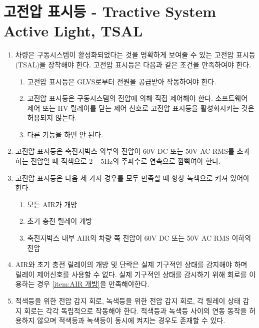 \documentclass[final,a4paper,10pt]{report}
\begin{document}
\section{고전압 표시등 - Tractive System Active Light, TSAL}
\begin{enumerate}
  \item 차량은 구동시스템이 활성화되었다는 것을 명확하게 보여줄 수 있는 고전압 표시등(TSAL)을 장착해야 한다. 고전압 표시등은 다음과 같은 조건을 만족하여야 한다.
    \begin{enumerate}
      \item 고전압 표시등은 GLVS로부터 전원을 공급받아 작동하여야 한다.
      \item 고전압 표시등은 구동시스템의 전압에 의해 직접 제어해야 한다. 소프트웨어 제어 또는 HV 릴레이를 닫는 제어 신호로 고전압 표시등을 활성화시키는 것은 허용되지 않는다.
      \item 다른 기능을 하면 안 된다.
    \end{enumerate}
    
  \item 고전압 표시등은 축전지박스 외부의 전압이 60V DC 또는 50V AC RMS를 초과하는 전압일 때 적색으로 2 \string~ 5Hz의 주파수로 연속으로 깜빡여야 한다.
  
  \item 고전압 표시등은 다음 세 가지 경우를 모두 만족할 때 항상 녹색으로 켜져 있어야 한다. \label{item:고전압 표시등 녹색}
    \begin{enumerate}
      \item 모든 AIR가 개방
      \item 초기 충전 릴레이 개방
      \item 축전지박스 내부 AIR의 차량 쪽 전압이 60V DC 또는 50V AC RMS 이하의 전압
    \end{enumerate}
    
  \item AIR와 초기 충전 릴레이의 개방 및 단락은 실제 기구적인 상태를 감지해야 하며 릴레이 제어신호를 사용할 수 없다. 실제 기구적인 상태를 감시하기 위해 회로를 이용하는 경우 \cref{item:AIR 개방}을 만족해야한다.
  \item 적색등을 위한 전압 감지 회로, 녹색등을 위한 전압 감지 회로, 각 릴레이 상태 감지 회로는 각각 독립적으로 작동해야 한다. 적색등과 녹색등 사이의 연동 동작을 허용하지 않으며 적색등과 녹색등이 동시에 켜지는 경우도 존재할 수 있다.
  

\end{enumerate}
\end{document}
